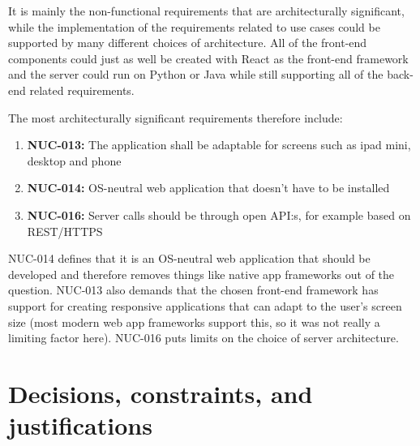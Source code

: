 \documentclass[10pt,a4paper]{article}
\begin{document}
It is mainly the non-functional requirements that are architecturally significant, while the implementation of the requirements related to use cases could be supported by many different choices of architecture. All of the front-end components could just as well be created with React as the front-end framework and the server could run on Python or Java while still supporting all of the back-end related requirements. 

The most architecturally significant requirements therefore include:
\begin{enumerate}
\item \textbf{NUC-013:} The application shall be adaptable for screens such as ipad mini, desktop and phone
\item \textbf{NUC-014:} OS-neutral web application that doesn't have to be installed
\item \textbf{NUC-016:} Server calls should be through open API:s, for example based on REST/HTTPS
\end{enumerate}
NUC-014 defines that it is an OS-neutral web application that should be developed and therefore removes things like native app frameworks out of the question. NUC-013 also demands that the chosen front-end framework has support for creating responsive applications that can adapt to the user's screen size (most modern web app frameworks support this, so it was not really a limiting factor here). NUC-016 puts limits on the choice of server architecture.

\section{Decisions, constraints, and justifications}
\end{document}
